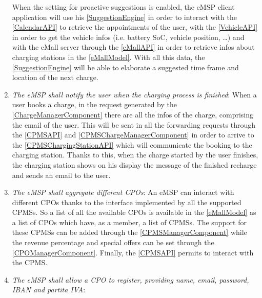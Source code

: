 \begin{enumerate}[label=\textbf{R\arabic*}]
    When the setting for proactive suggestions is enabled, the \ac{eMSP} client application will use his \ref{SuggestionEngine} in order to interact with the \ref{CalendarAPI} to retrieve the appointments of the user, with the \ref{VehicleAPI} in order to get the vehicle infos (i.e. battery \ac{SoC}, vehicle position, \ldots) and with the \ac{eMall} server through the \ref{eMallAPI} in order to retrieve infos about charging stations in the \ref{eMallModel}. 
    With all this data, the \ref{SuggestionEngine} will be able to elaborate a suggested time frame and location of the next charge.
    \label{req:eMSP-proactive-suggestions}
    \item \textit{The \ac{eMSP} shall notify the user when the charging process is finished}:
    When a user books a charge, in the request generated by the \ref{ChargeManagerComponent} there are all the infos of the charge, comprising the email of the user. This will be sent in all the forwarding requests through the \ref{CPMSAPI} and \ref{CPMSChargeManagerComponent} in order to arrive to the \ref{CPMSChargingStationAPI} which will communicate the booking to the charging station.
    Thanks to this, when the charge started by the user finishes, the charging station shows on his display the message of the finished recharge and sends an email to the user.
    \label{req:eMSP-notification}
    \item \textit{The \ac{eMSP} shall aggregate different \acp{CPO}}:
    An \ac{eMSP} can interact with different \acp{CPO} thanks to the interface implemented by all the supported \acp{CPMS}. 
    So a list of all the available \acp{CPO} is available in the \ref{eMallModel} as a list of \acp{CPO} which have, as a member, a list of \acp{CPMS}. 
    The support for these \acp{CPMS} can be added through the \ref{CPMSManagerComponent} while the revenue percentage and special offers can be set through the \ref{CPOManagerComponent}. 
    Finally, the \ref{CPMSAPI} permits to interact with the \ac{CPMS}.
    \label{req:eMSP-compatible}
    \item \textit{The \ac{eMSP} shall allow a \ac{CPO} to register, providing name, email, password, \ac{IBAN} and \gls{partita IVA}}: 

\end{enumerate}
